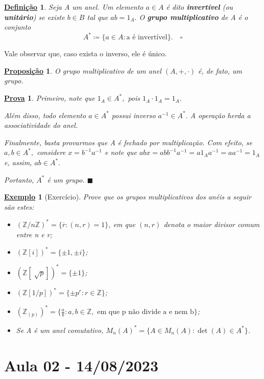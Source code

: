 \documentclass{article}
\newtheorem*{def*}{\underline{Defini\c c\~ao}}
\newtheorem*{prop*}{\underline{Proposi\c c\~ao}}
\newtheorem{example}{\underline{Exemplo}}
\newtheorem*{proof*}{\underline{Prova}}
\renewcommand\qedsymbol{$\blacksquare$}
\begin{document}
\begin{def*}
  Seja A um anel. Um elemento \(a\in A\) é dito \textbf{invertível} (ou \textbf{unitário}) se existe \(b\in B\) tal que \(ab = 1_{A}.\) O \textbf{grupo multiplicativo} de A
  é o conjunto 
  \[
    A^{*}\coloneqq \{a\in A: \text{a é invertível}\}.\quad\square
  \]
\end{def*}
Vale observar que, caso exista o inverso, ele é único.
\begin{prop*}
  O grupo multiplicativo de um anel \((A, +, \cdot )\) é, de fato, um grupo.
\end{prop*}
\begin{proof*}
  Primeiro, note que \(1_{A}\in A^{*},\) pois \(1_{A} \cdot 1_{A} = 1_{A}.\) 

  Além disso, todo elemento \(a\in A^{*}\) possui inverso \(a^{-1}\in A^{*}.\) A operação herda a associatividade do anel. 

  Finalmente, basta provarmos que A é fechado por multiplicação. Com efeito, se \(a, b\in A^{*},\) considere \(x = b^{-1}a^{-1}\) e note que \(abx = abb^{-1}a^{-1} =
  a 1_{A} a^{-1} = aa^{-1} = 1_{A}\) e, assim, \(ab\in A^{*}.\)

  Portanto, \(A^{*}\) é um grupo. \qedsymbol
\end{proof*}
\begin{example}[Exercício]
  Prove que os grupos multiplicativos dos anéis a seguir são estes:
  \begin{itemize}
    \item[1)] \((\mathbb{Z}/n \mathbb{Z})^{*} = \{\overline{r}: (n, r) = 1\}\), em que \((n, r)\) denota o \textit{maior divisor comum} entre n e r;
    \item[2)] \((\mathbb{Z}[i])^{*}=\{\pm1, \pm i\}\);
    \item[3)] \((\mathbb{Z}[\sqrt[]{p}])^{*} = \{\pm1\}\);
    \item[4)] \((\mathbb{Z}[1/p])^{*} = \{\pm p^{r}: r\in \mathbb{Z}\}\);
    \item[5)] \((\mathbb{Z}_{(p)})^{*} = \biggl\{\frac{a}{b}: a, b\in \mathbb{Z}, \text{ em que p não divide a e nem b}\biggr\}\);
    \item[6)] Se A é um anel comutativo, \(M_{n}(A)^{*} = \{A\in M_{n}(A): \det{(A)}\in A^{*}\}\).
  \end{itemize}
\end{example}
\newpage

\section{Aula 02 - 14/08/2023}
\end{document}
